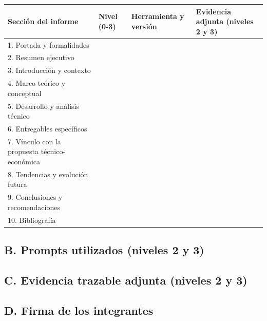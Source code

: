 {\scriptsize
\begin{longtable}{|p{5.6cm}|p{1.6cm}|p{3.4cm}|p{4.3cm}|}
    \hline
    \textbf{Sección del informe} & \textbf{Nivel (0-3)} & \textbf{Herramienta y versión} & \textbf{Evidencia adjunta (niveles 2 y 3)} \\
    \hline
    \endhead
    1. Portada y formalidades & & & \\ \hline
    2. Resumen ejecutivo & & & \\ \hline
    3. Introducción y contexto & & & \\ \hline
    4. Marco teórico y conceptual & & & \\ \hline
    5. Desarrollo y análisis técnico & & & \\ \hline
    6. Entregables específicos & & & \\ \hline
    7. Vínculo con la propuesta técnico-económica & & & \\ \hline
    8. Tendencias y evolución futura & & & \\ \hline
    9. Conclusiones y recomendaciones & & & \\ \hline
    10. Bibliografía & & & \\ \hline
\end{longtable}
}

\subsection*{B. Prompts utilizados (niveles 2 y 3)}


\subsection*{C. Evidencia trazable adjunta (niveles 2 y 3)}


\subsection*{D. Firma de los integrantes}

%

